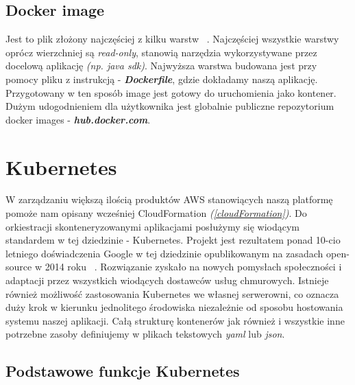 \subsection{Docker image}
Jest to plik złożony najczęściej z kilku warstw ~\cite{docker-doc}. 
Najczęściej wszystkie warstwy oprócz wierzchniej są \emph{read-only}, stanowią narzędzia wykorzystywane przez docelową aplikację \emph{(np. java sdk)}.
Najwyższa warstwa budowana jest przy pomocy pliku z instrukcją - \emph{\textbf{Dockerfile}}, gdzie dokładamy naszą aplikację.
Przygotowany w ten sposób image jest gotowy do uruchomienia jako kontener. Dużym udogodnieniem dla użytkownika jest globalnie publiczne repozytorium docker images - \emph{\textbf{hub.docker.com}}.


\section{Kubernetes}
W zarządzaniu większą ilością produktów AWS stanowiących naszą platformę pomoże nam opisany wcześniej CloudFormation \emph{(\ref{cloudFormation})}. 
Do orkiestracji skonteneryzowanymi aplikacjami posłużymy się wiodącym standardem w tej dziedzinie - Kubernetes.
Projekt jest rezultatem ponad 10-cio letniego doświadczenia Google w tej dziedzinie opublikowanym na zasadach open-source w 2014 roku ~\cite{k8s-what}.
Rozwiązanie zyskało na nowych pomysłach społeczności i adaptacji przez wszystkich wiodących dostawców usług chmurowych.
Istnieje również możliwość zastosowania Kubernetes we własnej serwerowni, 
co oznacza duży krok w kierunku jednolitego środowiska niezależnie od sposobu hostowania systemu naszej aplikacji.
Całą strukturę kontenerów jak również i wszystkie inne potrzebne zasoby definiujemy w plikach tekstowych {\em yaml} lub {\em json}.

\subsection{Podstawowe funkcje Kubernetes}

